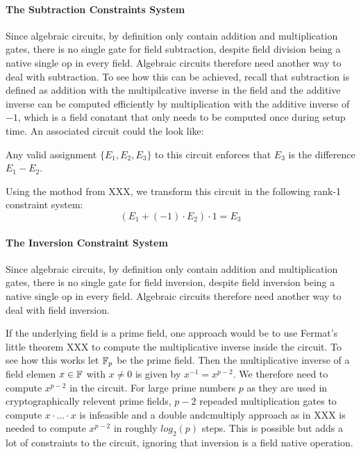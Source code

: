 \paragraph{The Subtraction Constraints System}Since algebraic circuits, by definition only contain addition and multiplication gates, there is no single gate for field subtraction, despite field division being a native single op in every field. Algebraic circuits therefore need another way to deal with subtraction. To see how this can be achieved, recall that subtraction is defined as addition with the multipilcative inverse in the field and the additive inverse can be computed efficiently by multiplication with the additive inverse of $-1$, which is a field conatant that only needs to be computed once during setup time. An associated circuit could the look like:
\begin{center}
\end{center}
Any valid assignment $\{E_1,E_2, E_3\}$ to this circuit enforces that $E_3$ is the difference $E_1- E_2$.

Using the mothod from XXX, we transform this circuit in the following rank-1 constraint system:
\begin{equation}
\left(E_1 + (-1)\cdot E_2\right)\cdot 1 = E_3
\end{equation}

\paragraph{The Inversion Constraint System} Since algebraic circuits, by definition only contain addition and multiplication gates, there is no single gate for field inversion, despite field inversion being a native single op in every field. Algebraic circuits therefore need another way to deal with field inversion. 

If the underlying field is a prime field, one approach would be to use Fermat's little theorem XXX to compute the multiplicative inverse inside the circuit. To see how this works let $\mathbb{F}_p$ be the prime field. Then the multiplicative inverse of a field elemen $x\in\mathbb{F}$ with $x\neq 0$ is given by $x^{-1}= x^{p-2}$. We therefore need to compute $x^{p-2}$ in the circuit. For large prime numbers $p$ as they are used in cryptographically relevent prime fields, $p-2$ repeaded multiplication gates to compute $x\cdot\ldots \cdot x$ is infeasible and a double andcmultiply approach as in XXX is needed to compute $x^{p-2}$ in roughly $log_2(p)$ steps. This is possible but adds a lot of constraints to the circuit, ignoring that inversion is a field native operation.

